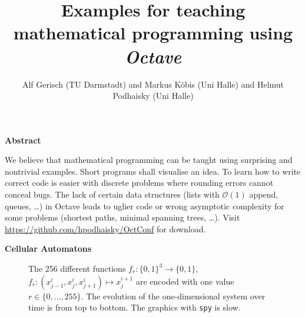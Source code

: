 \documentclass{beamer}
\title{Examples for teaching mathematical programming 
       using \emph{Octave}}
\author{Alf Gerisch (TU Darmstadt) and 
   Markus Köbis (Uni Halle) and Helmut Podhaisky (Uni Halle)}
\date{} %
\def\sect#1{\textbf{\color{blue} #1}}
\begin{document}
\begin{frame}[t]{}
\begin{multicols}{5}
\sect{Abstract}

We believe that mathematical programming can be taught using surprising and
nontrivial examples. Short programs shall visualise an idea.  To learn how to
write correct code is easier with discrete problems where rounding errors
cannot conceal bugs.  The lack of certain data structures (lists with
$\mathcal{O}(1)$ append, queues, \dots) in Octave leads to uglier code or wrong
asymptotic complexity for some problems (shortest paths, minimal spanning
trees, \dots). Visit \url{https://github.com/hpodhaisky/OctConf} for download.

\medskip 

\sect{Cellular Automatons}

\begin{figure}
\caption{The 256 different functions $f_r\colon\{0,1\}^3\to\{0,1\}$, $f_r\colon (x^{i}_{j-1},x^{i}_j,x^{i}_{j+1})\mapsto x^{i+1}_j$
are encoded with one value $r\in \{0,\dots,255\}$.
The evolution of the one-dimensional system over time is from top to bottom. 
The graphics with \texttt{spy} is slow.}
\end{figure}


\end{multicols}
\end{frame}
\end{document}
